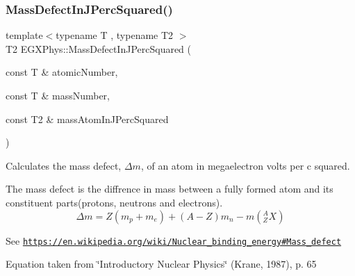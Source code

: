 \subsubsection{\texorpdfstring{Mass\+Defect\+In\+J\+Perc\+Squared()}{MassDefectInJPercSquared()}}
{\footnotesize\ttfamily template$<$typename T , typename T2 $>$ \\
T2 E\+G\+X\+Phys\+::\+Mass\+Defect\+In\+J\+Perc\+Squared (\begin{DoxyParamCaption}\item[{const T \&}]{atomic\+Number,  }\item[{const T \&}]{mass\+Number,  }\item[{const T2 \&}]{mass\+Atom\+In\+J\+Perc\+Squared }\end{DoxyParamCaption})}



Calculates the mass defect, $\Delta m$, of an atom in megaelectron volts per c squared. 

The mass defect is the diffrence in mass between a fully formed atom and its constituent parts(protons, neutrons and electrons). \[\Delta m = Z(m_p + m_e)+(A-Z)m_n - m({^A_ZX})\]

See \href{https://en.wikipedia.org/wiki/Nuclear_binding_energy#Mass_defect}{\tt https\+://en.\+wikipedia.\+org/wiki/\+Nuclear\+\_\+binding\+\_\+energy\#\+Mass\+\_\+defect}

Equation taken from \char`\"{}\+Introductory Nuclear Physics\char`\"{} (Krane, 1987), p. 65


